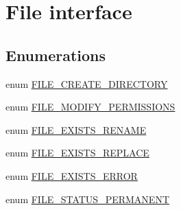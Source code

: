 \hypertarget{group__file}{
\section{File interface}
\label{group__file}
}
\subsection*{Enumerations}
\begin{DoxyCompactItemize}
\item 
enum \hyperlink{group__file_ga851cbf30c0a6d31a1733590cf80c39e5}{FILE\_\-CREATE\_\-DIRECTORY} 
\item 
enum \hyperlink{group__file_ga30d56f1f9c1a4d832c411ef51d9b276d}{FILE\_\-MODIFY\_\-PERMISSIONS} 
\item 
enum \hyperlink{group__file_ga5d6636d4ccd022885823b91f17a0f464}{FILE\_\-EXISTS\_\-RENAME} 
\item 
enum \hyperlink{group__file_ga54c3c90d9cb7857114326cb5114e7159}{FILE\_\-EXISTS\_\-REPLACE} 
\item 
enum \hyperlink{group__file_ga99e741faa66e03cdb8738b717be227fd}{FILE\_\-EXISTS\_\-ERROR} 
\item 
enum \hyperlink{group__file_gaf208a7c7d7fd09276233583b22e4ee32}{FILE\_\-STATUS\_\-PERMANENT} 
\end{DoxyCompactItemize}
